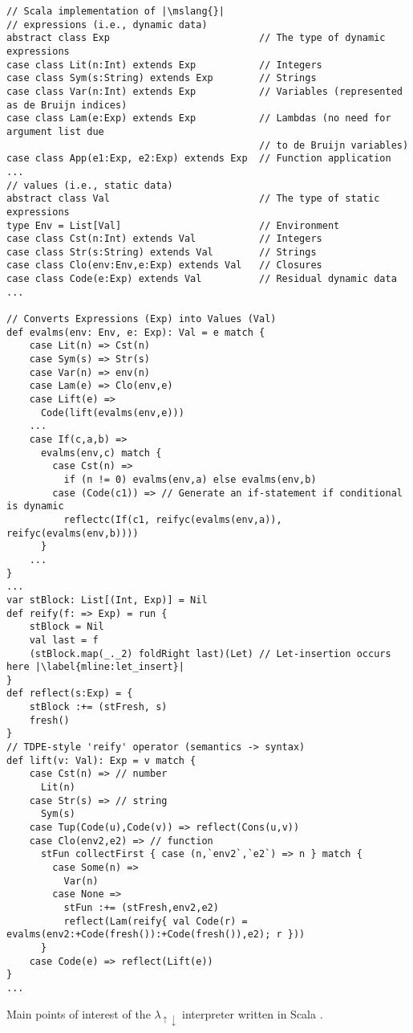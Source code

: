 \documentclass[a4paper,12pt,twoside,openright]{report}
\theoremstyle{definition}
\newcommand{\mslang}{$\lambda_{\uparrow\downarrow}$}
\newenvironment{longlisting}{\captionsetup{type=listing}}{}
\begin{document}
\newpage
\begin{longlisting}
    \centering
    \begin{verbatim}
// Scala implementation of |\mslang{}|
// expressions (i.e., dynamic data)
abstract class Exp                          // The type of dynamic expressions
case class Lit(n:Int) extends Exp           // Integers
case class Sym(s:String) extends Exp        // Strings
case class Var(n:Int) extends Exp           // Variables (represented as de Bruijn indices)
case class Lam(e:Exp) extends Exp           // Lambdas (no need for argument list due
                                            // to de Bruijn variables)
case class App(e1:Exp, e2:Exp) extends Exp  // Function application
...
// values (i.e., static data)
abstract class Val                          // The type of static expressions
type Env = List[Val]                        // Environment
case class Cst(n:Int) extends Val           // Integers
case class Str(s:String) extends Val        // Strings
case class Clo(env:Env,e:Exp) extends Val   // Closures
case class Code(e:Exp) extends Val          // Residual dynamic data
...

// Converts Expressions (Exp) into Values (Val)
def evalms(env: Env, e: Exp): Val = e match {
    case Lit(n) => Cst(n)
    case Sym(s) => Str(s)
    case Var(n) => env(n)
    case Lam(e) => Clo(env,e)
    case Lift(e) =>
      Code(lift(evalms(env,e)))
    ...
    case If(c,a,b) =>
      evalms(env,c) match {
        case Cst(n) => 
          if (n != 0) evalms(env,a) else evalms(env,b)
        case (Code(c1)) => // Generate an if-statement if conditional is dynamic
          reflectc(If(c1, reifyc(evalms(env,a)), reifyc(evalms(env,b))))
      }
    ...
}
...
var stBlock: List[(Int, Exp)] = Nil
def reify(f: => Exp) = run {
    stBlock = Nil
    val last = f
    (stBlock.map(_._2) foldRight last)(Let) // Let-insertion occurs here |\label{mline:let_insert}|
}
def reflect(s:Exp) = {
    stBlock :+= (stFresh, s)
    fresh()
}
// TDPE-style 'reify' operator (semantics -> syntax)
def lift(v: Val): Exp = v match {
    case Cst(n) => // number
      Lit(n)
    case Str(s) => // string
      Sym(s)
    case Tup(Code(u),Code(v)) => reflect(Cons(u,v))
    case Clo(env2,e2) => // function
      stFun collectFirst { case (n,`env2`,`e2`) => n } match {
        case Some(n) =>
          Var(n)
        case None =>
          stFun :+= (stFresh,env2,e2)
          reflect(Lam(reify{ val Code(r) = evalms(env2:+Code(fresh()):+Code(fresh()),e2); r }))
      }
    case Code(e) => reflect(Lift(e))
}
...
    \end{verbatim}
    \caption{Main points of interest of the \mslang{} interpreter written in Scala \cite{odersky2004overview}.}
    \label{lst:evalms}
\end{longlisting}
\newpage
\end{document}
